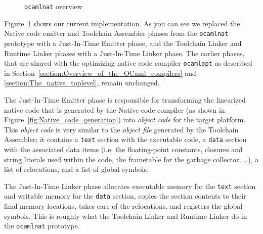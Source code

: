 \documentclass[10pt,a4paper,draft,twocolumn]{article}
\makeatletter
\newcommand{\ie}{i.e.\@\xspace}
\makeatother
\begin{document}
\begin{figure}[htb]
  \centering
  \caption{\texttt{ocamlnat} overview}
  \label{fig:ocamlnat_overview}
\end{figure}

Figure~\ref{fig:ocamlnat_overview} shows our current implementation. As you can see we replaced
the Native code emitter and Toolchain Assembler phases from the \texttt{ocamlnat} prototype with
a Just-In-Time Emitter phase, and the Toolchain Linker and Runtime Linker phases with a Just-In-Time
Linker phase. The earlier phases, that are shared with the optimizing native code compiler
\texttt{ocamlopt} as described in Section~\ref{section:Overview_of_the_OCaml_compilers} and
\ref{section:The_native_toplevel}, remain unchanged.

The Just-In-Time Emitter phase is responsible for transforming the linearized native code that is
generated by the Native code compiler (as shown in Figure~\ref{fig:Native_code_generation}) into
\emph{object code} for the target platform. This \emph{object code} is very similar to the \emph{object
file} generated by the Toolchain Assembler; it contains a \texttt{text} section with the executable
code, a \texttt{data} section with the associated data items (\ie the floating-point constants, closures
and string literals used within the code, the frametable for the garbage collector, \ldots), a list
of relocations, and a list of global symbols.

The Just-In-Time Linker phase allocates executable memory for the \texttt{text} section and writable
memory for the \texttt{data} section, copies the section contents to their final memory locations,
takes care of the relocations, and registers the global symbols. This is roughly what the Toolchain
Linker and Runtime Linker do in the \texttt{ocamlnat} prototype.
\end{document}
